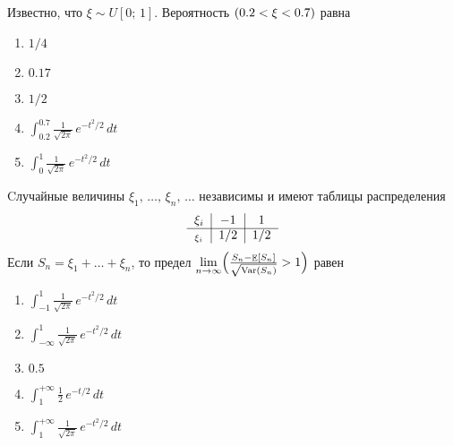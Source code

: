 \documentclass[t]{beamer}
\DeclareMathOperator{\Var}{Var}
\DeclareMathOperator{\E}{\mathbb{E}}
\let\P\relax
\DeclareMathOperator{\P}{\mathbb{P}}
\begin{document}
 \begin{frame} \label{16} 
\begin{block}{16} 

  Известно, что $\xi \sim U[0;\,1]$. Вероятность $\P(0.2<\xi<0.7)$ равна
  
 \end{block} 
\begin{enumerate} 
\item[] \hyperlink{16-No}{\beamergotobutton{} $1/4$}
\item[] \hyperlink{16-No}{\beamergotobutton{} $0.17$}
\item[] \hyperlink{16-Yes}{\beamergotobutton{} $1/2$}
\item[] \hyperlink{16-No}{\beamergotobutton{} $\int_{0.2}^{0.7}\frac{1}{\sqrt{2\pi}}\,e^{-t^2/2}\,dt$}
\item[] \hyperlink{16-No}{\beamergotobutton{} $\int_{0}^{1}\frac{1}{\sqrt{2\pi}}\,e^{-t^2/2}\,dt$}
\end{enumerate} 
\end{frame} 


 \begin{frame} \label{17} 
\begin{block}{17} 

    Cлучайные величины $\xi_1, \, \ldots, \, \xi_n, \, \ldots$ независимы и имеют таблицы распределения
    \[
    \begin{tabular}{c|c|c}
      $\xi_i$                     & $-1$   & $1$   \\ \cline{1-3}
      $\P_{\xi_i}$        & $1/2$       & $1/2$   \\
    \end{tabular}
    \]
    Если $S_n = \xi_1 + \ldots + \xi_n$, то предел $\lim\limits_{n \rightarrow \infty}\P\Bigl(\frac{S_n - \E[S_n]}{\sqrt{\Var(S_n)}} > 1\Bigr)$ равен
  


 \end{block} 
\begin{enumerate} 
\item[] \hyperlink{17-No}{\beamergotobutton{} $\int_{-1}^{1}\frac{1}{\sqrt{2\pi}}\,e^{-t^2/2}\,dt$}
\item[] \hyperlink{17-No}{\beamergotobutton{} $\int_{-\infty}^{1}\frac{1}{\sqrt{2\pi}}\,e^{-t^2/2}\,dt$}
\item[] \hyperlink{17-No}{\beamergotobutton{} $0.5$}
\item[] \hyperlink{17-No}{\beamergotobutton{} $\int_{1}^{+\infty}\frac{1}{2}\,e^{-t/2}\,dt$}
\item[] \hyperlink{17-Yes}{\beamergotobutton{} $\int_{1}^{+\infty}\frac{1}{\sqrt{2\pi}}\,e^{-t^2/2}\,dt$}
\end{enumerate} 
\end{frame} 
\end{document}
